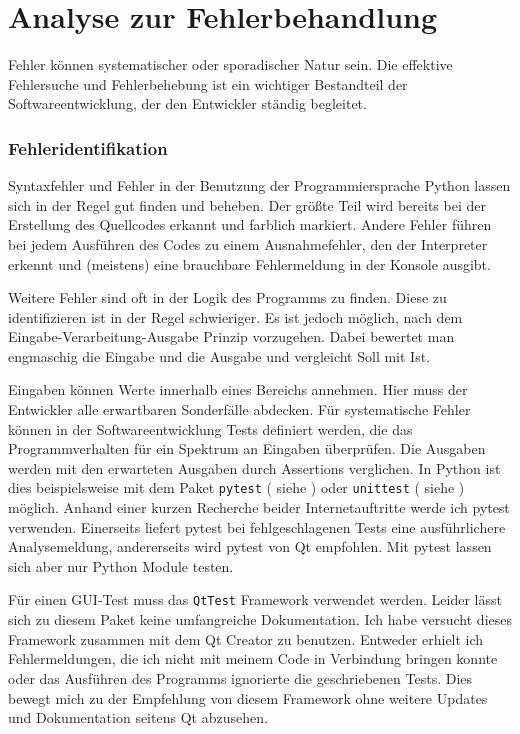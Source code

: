 \chapter{Analyse zur Fehlerbehandlung}\label{Fehlerbehandlung}

Fehler können systematischer oder sporadischer Natur sein.
Die effektive Fehlersuche und Fehlerbehebung ist ein wichtiger Bestandteil der Softwareentwicklung, der den Entwickler 
ständig begleitet. 

\subsection{Fehleridentifikation}

Syntaxfehler und Fehler in der Benutzung der Programmiersprache Python lassen sich in der Regel gut finden und beheben.
Der größte Teil wird bereits bei der Erstellung des Quellcodes erkannt und farblich markiert. 
Andere Fehler führen bei jedem Ausführen des Codes zu einem Ausnahmefehler, den der Interpreter erkennt und (meistens) eine brauchbare
Fehlermeldung in der Konsole ausgibt. 

Weitere Fehler sind oft in der Logik des Programms zu finden. Diese zu identifizieren ist in der Regel schwieriger.
Es ist jedoch möglich, nach dem Eingabe-Verarbeitung-Ausgabe Prinzip vorzugehen. 
Dabei bewertet man engmaschig die Eingabe und die Ausgabe und vergleicht Soll mit Ist. 

Eingaben können Werte innerhalb eines Bereichs annehmen.
Hier muss der Entwickler alle erwartbaren Sonderfälle abdecken.
Für systematische Fehler können in der Softwareentwicklung Tests definiert werden, die das Programmverhalten 
für ein Spektrum an Eingaben überprüfen.
Die Ausgaben werden mit den erwarteten Ausgaben durch Assertions verglichen.
In Python ist dies beispielsweise mit dem Paket \verb|pytest| ( siehe \cite{pytestHP}) oder \verb|unittest| ( siehe \cite{unittestHP}) möglich.
Anhand einer kurzen Recherche beider Internetauftritte werde ich pytest verwenden.
Einerseits liefert pytest bei fehlgeschlagenen Tests eine ausführlichere Analysemeldung, andererseits wird pytest von Qt empfohlen.
Mit pytest lassen sich aber nur Python Module testen.

Für einen GUI-Test muss das \verb|QtTest| Framework verwendet werden.
Leider lässt sich zu diesem Paket keine umfangreiche Dokumentation. 
Ich habe versucht dieses Framework zusammen mit dem Qt Creator zu benutzen. 
Entweder erhielt ich Fehlermeldungen, die ich nicht mit meinem Code in Verbindung bringen konnte 
oder das Ausführen des Programms ignorierte die geschriebenen Tests.
Dies bewegt mich zu der Empfehlung von diesem Framework ohne weitere Updates und Dokumentation seitens Qt abzusehen.

